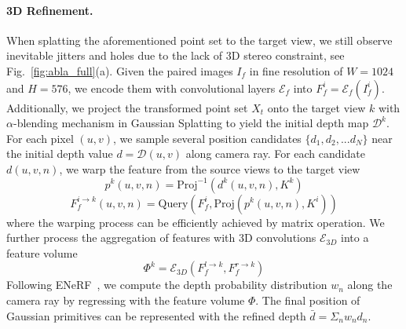 \paragraph{3D Refinement.} When splatting the aforementioned point set to the target view, we still observe inevitable jitters and holes due to the lack of 3D stereo constraint, see Fig.~\ref{fig:abla_full}(a). 
%
Given the paired images $I_f$ in fine resolution of $W = 1024$ and $H=576$, we encode them with convolutional layers $\mathcal{E}_f$ into $F_f^i = \mathcal{E}_f(I_f^i)$. 
%
Additionally, we project the transformed point set $X_t$ onto the target view $k$ with $\alpha$-blending mechanism in Gaussian Splatting to yield the initial depth map $\mathcal{D}^k$.
%
For each pixel $(u,v)$, we sample several position candidates $\{d_1, d_2,...d_N\}$ near the initial depth value $d = \mathcal{D}(u,v)$ along camera ray.
%
For each candidate $d(u,v,n)$, we warp the feature from the source views to the target view
\begin{equation}
    p^k(u,v,n) = \text{Proj}^{-1}(d^k(u,v,n), K^k)
\end{equation}
\begin{equation}
\label{eq:warp}
    F_f^{i \rightarrow k}(u,v,n) = \text{Query}(F_f^i , \text{Proj}(p^k(u,v,n), K^i))
\end{equation}
where the warping process can be efficiently achieved by matrix operation.
We further process the aggregation of features with 3D convolutions $\mathcal{E}_{3D}$ into a feature volume 
\begin{equation}
    \Phi^k = \mathcal{E}_{3D}(F_f^{l \rightarrow k} , F_f^{r \rightarrow k})
\end{equation}
Following ENeRF~\cite{lin2022enerf}, we compute the depth probability distribution $w_n$ along the camera ray by regressing with the feature volume $\Phi$.
%
The final position of Gaussian primitives can be represented with the refined depth $\bar{d} = \Sigma_n w_n d_n$.

